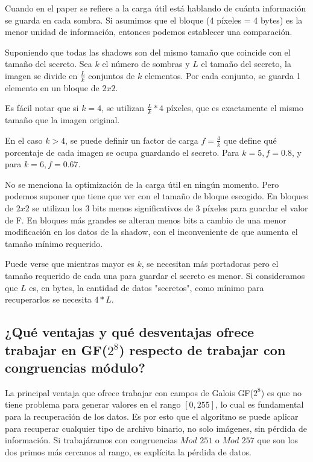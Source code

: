 \documentclass[11pt]{scrartcl} %
\begin{document}
Cuando en el paper se refiere a la carga útil está hablando de cuánta información se guarda en cada sombra. Si asumimos que el bloque (4 píxeles = 4 bytes) es la menor unidad de información, entonces podemos establecer una comparación.

Suponiendo que todas las shadows son del mismo tamaño que coincide con el tamaño del secreto. Sea $k$ el número de sombras y $L$ el tamaño del secreto, la imagen se divide en $\frac{L}{k}$ conjuntos de $k$ elementos. Por cada conjunto, se guarda 1 elemento en un bloque de $2x2$.

Es fácil notar que si $k = 4$, se utilizan $\frac{L}{k} * 4$ píxeles, que es exactamente el mismo tamaño que la imagen original.

En el caso $k > 4$, se puede definir un factor de carga $f = \frac{4}{k}$ que define qué porcentaje de cada imagen se ocupa guardando el secreto. Para $k = 5, f = 0.8$, y para $k = 6, f = 0.67$.

No se menciona la optimización de la carga útil en ningún momento. Pero podemos suponer que tiene que ver con el tamaño de bloque escogido. En bloques de $2x2$ se utilizan los 3 bits menos significativos de 3 píxeles para guardar el valor de F. En bloques más grandes se alteran menos bits a cambio de una menor modificación en los datos de la shadow, con el inconveniente de que aumenta el tamaño mínimo requerido.  

Puede verse que mientras mayor es $k$, se necesitan más portadoras pero el tamaño requerido de cada una para guardar el secreto es menor. Si consideramos que $L$ es, en bytes, la cantidad de datos "secretos", como mínimo para recuperarlos se necesita $4*L$. 


\subsection{¿Qué ventajas y qué desventajas ofrece trabajar en GF($2^{8}$) respecto de trabajar con congruencias módulo?}

La principal ventaja que ofrece trabajar con campos de Galois GF($2^8$) es que no tiene problema para generar valores en el rango $[0,255]$, lo cual es fundamental para la recuperación de los datos. Es por esto que el algoritmo se puede aplicar para recuperar cualquier tipo de archivo binario, no solo imágenes, sin pérdida de información. Si trabajáramos con congruencias $Mod$ $251$ o $Mod$ $257$ que son los dos primos más cercanos al rango, es explícita la pérdida de datos.
\end{document}
